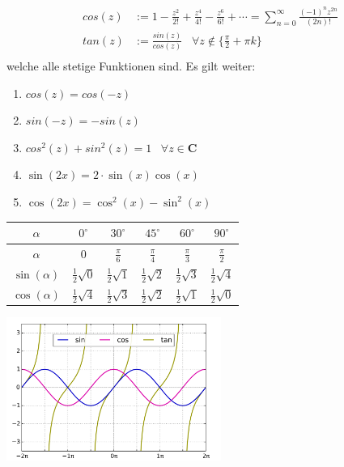 \documentclass[10pt]{article}
\begin{document}
\begin{multicols*}{3}
\begin{align*}
    cos(z) & := 1 - \frac{z^2}{2!} + \frac{z^4}{4!} - \frac{z^6}{6!} + \cdots = \sum_{n = 0}^\infty \frac{(-1)^n z^{2n}}{(2n)!}       \\
    tan(z) & := \frac{sin(z)}{cos(z)}\;\;\; \forall z \not \in \{\frac{\pi}{2} + \pi k\}                                              \\
  \end{align*}
  welche alle stetige Funktionen sind. Es gilt weiter:
  \begin{enumerate}[label=(\arabic*)]
    \item $cos(z) = cos(-z)$
    \item $sin(-z) = -sin(z)$
    \item $cos^2(z) + sin^2(z) = 1 \;\;\; \forall z \in \mathbf{C}$
    \item $\sin(2x) = 2 \cdot \sin(x) \cos(x)$
    \item $\cos(2x) = \cos^2(x) - \sin^2(x)$
  \end{enumerate}
  \begin{center}
    \begin{tabular}{ |c c c c c c| }
      \hline
      $\alpha$       & $0^\circ$              & $30^\circ$             & $45^\circ$             & $60^\circ$             & $90^\circ$             \\
      \hline
      $\alpha$       & $0$                    & $\frac{\pi}{6}$        & $\frac{\pi}{4}$        & $\frac{\pi}{3}$        & $\frac{\pi}{2}$        \\
      \hline
      $\sin(\alpha)$ & $\frac{1}{2} \sqrt{0}$ & $\frac{1}{2} \sqrt{1}$ & $\frac{1}{2} \sqrt{2}$ & $\frac{1}{2} \sqrt{3}$ & $\frac{1}{2} \sqrt{4}$ \\
      \hline
      $\cos(\alpha)$ & $\frac{1}{2} \sqrt{4}$ & $\frac{1}{2} \sqrt{3}$ & $\frac{1}{2} \sqrt{2}$ & $\frac{1}{2} \sqrt{1}$ & $\frac{1}{2} \sqrt{0}$ \\
      \hline
    \end{tabular}
  \end{center}
  \includegraphics[width=7cm]{sincostan.png}

\end{multicols*}
\end{document}
